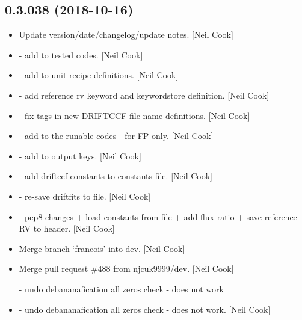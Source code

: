 \documentclass[a4paper,10pt,english]{report}
\begin{document}
\subsection{0.3.038 (2018-10-16)}
\label{\detokenize{misc/changelog:id292}}\begin{itemize}
\item {} 
Update version/date/changelog/update notes. {[}Neil Cook{]}

\item {} 
 - add  to tested codes. {[}Neil
Cook{]}

\item {} 
 - add  to unit recipe
definitions. {[}Neil Cook{]}

\item {} 
 - add reference rv keyword and keywordstore
definition. {[}Neil Cook{]}

\item {} 
 - fix tags in new DRIFTCCF file name definitions. {[}Neil
Cook{]}

\item {} 
 - add  to the runable codes
- for FP only. {[}Neil Cook{]}

\item {} 
 - add  to output keys. {[}Neil
Cook{]}

\item {} 
 - add driftccf constants to constants file.
{[}Neil Cook{]}

\item {} 
 - re-save driftfits to file. {[}Neil Cook{]}

\item {} 
 - pep8 changes + load constants from file
+ add flux ratio + save reference RV to header. {[}Neil Cook{]}

\item {} 
Merge branch ‘francois’ into dev. {[}Neil Cook{]}

\item {} 
Merge pull request \#488 from njcuk9999/dev. {[}Neil Cook{]}

 - undo debananafication all zeros check - does not work

\item {} 
 - undo debananafication all zeros check - does not
work. {[}Neil Cook{]}

\end{itemize}
\end{document}
